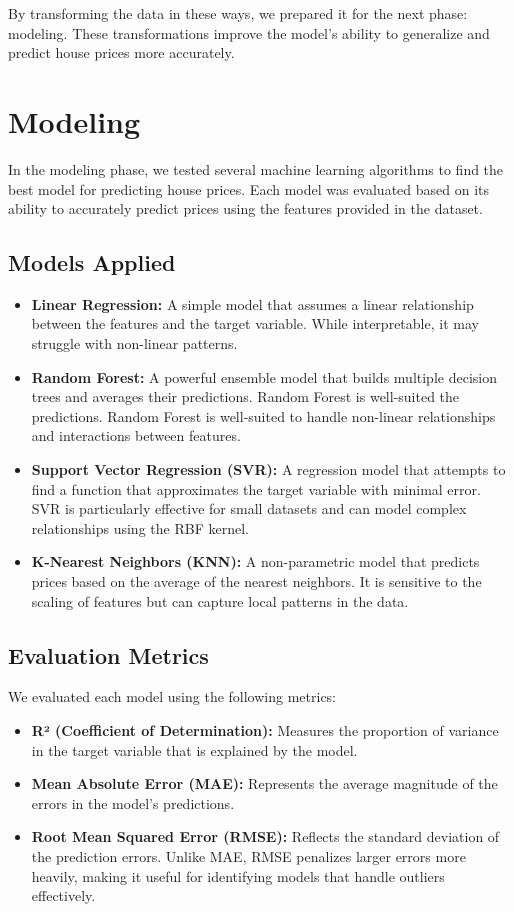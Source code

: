 \documentclass{article}
\begin{document}
By transforming the data in these ways, we prepared it for the next phase: modeling. These transformations improve the model's ability to generalize and predict house prices more accurately.

\section{Modeling}
In the modeling phase, we tested several machine learning algorithms to find the best model for predicting house prices. Each model was evaluated based on its ability to accurately predict prices using the features provided in the dataset.

\subsection{Models Applied}
\begin{itemize}
    \item \textbf{Linear Regression:} A simple model that assumes a linear relationship between the features and the target variable. While interpretable, it may struggle with non-linear patterns.
    \item \textbf{Random Forest:} A powerful ensemble model that builds multiple decision trees and averages their predictions. Random Forest is well-suited
the predictions. Random Forest is well-suited to handle non-linear relationships and interactions between features.
    \item \textbf{Support Vector Regression (SVR):} A regression model that attempts to find a function that approximates the target variable with minimal error. SVR is particularly effective for small datasets and can model complex relationships using the RBF kernel.
    \item \textbf{K-Nearest Neighbors (KNN):} A non-parametric model that predicts prices based on the average of the nearest neighbors. It is sensitive to the scaling of features but can capture local patterns in the data.
\end{itemize}

\subsection{Evaluation Metrics}
We evaluated each model using the following metrics:
\begin{itemize}
    \item \textbf{R² (Coefficient of Determination):} Measures the proportion of variance in the target variable that is explained by the model.
    \item \textbf{Mean Absolute Error (MAE):} Represents the average magnitude of the errors in the model’s predictions.
    \item \textbf{Root Mean Squared Error (RMSE):} Reflects the standard deviation of the prediction errors. Unlike MAE, RMSE penalizes larger errors more heavily, making it useful for identifying models that handle outliers effectively.
\end{itemize}
\end{document}

